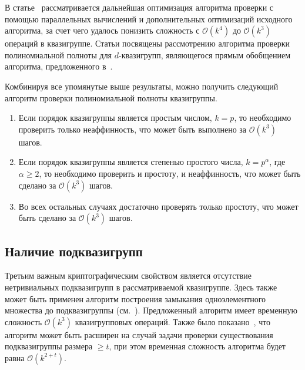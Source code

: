     В статье~\cite{galatenko2020efficient} рассматривается дальнейшая оптимизация алгоритма проверки с помощью параллельных вычислений и дополнительных оптимизаций исходного алгоритма, за счет чего удалось понизить сложность с $\mathcal{O}(k^4)$ до $\mathcal{O}(k^3)$ операций в квазигруппе.
    Статьи \cite{galatenko20check, galatenko21npolycomplete} посвящены рассмотрению алгоритма проверки полиномиальной полноты для $d$-квазигрупп, являющегося прямым обобщением алгоритма, предложенного в~\cite{galatenko18polycomp2}.

    Комбинируя все упомянутые выше результаты, можно получить следующий алгоритм проверки полиномиальной полноты квазигруппы.
    \begin{enumerate}
        \item Если порядок квазигруппы является простым числом, $k = p$, то необходимо проверить только неаффинность, что может быть выполнено за $\mathcal{O}(k^3)$ шагов.
        \item Если порядок квазигруппы является степенью простого числа, $k = p^{\alpha}$, где $\alpha \ge 2$, то необходимо проверить и простоту, и неаффинность, что может быть сделано за $\mathcal{O}(k^3)$ шагов.
        \item Во всех остальных случаях достаточно проверять только простоту, что может быть сделано за $\mathcal{O}(k^3)$ шагов.
    \end{enumerate}



\subsection{Наличие подквазигрупп}
\label{sec:subquasi}
    Третьим важным криптографическим свойством является отсутствие нетривиальных подквазигрупп в рассматриваемой квазигруппе.
    Здесь также может быть применен  алгоритм построения замыкания одноэлементного множества до подквазигруппы (см.~\cite{toropov18, sobyanin19}). 
    Предложенный алгоритм имеет временную сложность $\mathcal{O}(k^3)$ квазигрупповых операций.
    Также было показано~\cite{galatenko2022algorithms}, что алгоритм может быть расширен на случай задачи проверки существования подквазигруппы размера $\ge t$, при этом временная сложность алгоритма будет равна $\mathcal{O}(k^{2+t})$.

